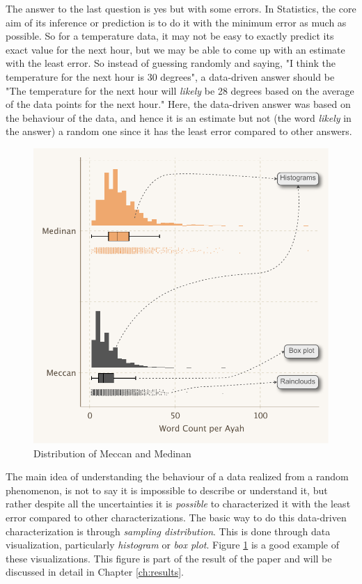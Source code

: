 The answer to the last question is yes but with some errors. In Statistics, the core aim of its inference or prediction is to do it with the minimum error as much as possible. So for a temperature data, it may not be easy to exactly predict its exact value for the next hour, but we may be able to come up with an estimate with the least error. So instead of guessing randomly and saying, "I think the temperature for the next hour is 30 degrees", a data-driven answer should be "The temperature for the next hour will \textit{likely} be 28 degrees based on the average of the data points for the next hour." Here, the data-driven answer was based on the behaviour of the data, and hence it is an estimate but not (the word \textit{likely} in the answer) a random one since it has the least error compared to other answers.

\begin{figure}[!t]
    \centering
    \includegraphics[width=\textwidth]{img/plot3.pdf}
    \caption{Distribution of Meccan and Medinan  }
    \label{fig:result_ayah_word_count}
\end{figure}

The main idea of understanding the behaviour of a data realized from a random phenomenon, is not to say it is impossible to describe or understand it, but rather despite all the uncertainties it is \textit{possible} to characterized it with the least error compared to other characterizations. The basic way to do this data-driven characterization is through \textit{sampling distribution}. This is done through data visualization, particularly \textit{histogram} or \textit{box plot}. Figure \ref{fig:result_ayah_word_count} is a good example of these visualizations. This figure is part of the result of the paper and will be discussed in detail in Chapter \ref{ch:results}. 

